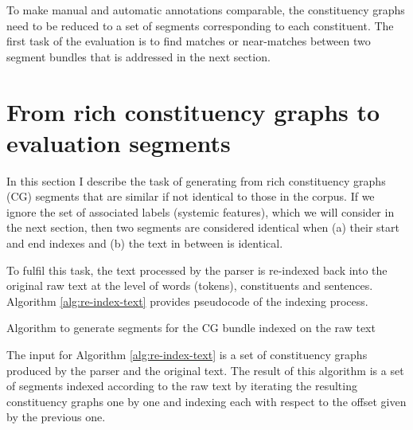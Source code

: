 To make manual and automatic annotations comparable, the constituency graphs need to be reduced to a set of segments corresponding to each constituent. The first task of the evaluation is to find matches or near-matches between two segment bundles that is addressed in the next section.

\section{From rich constituency graphs to evaluation segments}
\label{sec:segment-alignment}
In this section I describe the task of generating from rich constituency graphs (CG) segments that are similar if not identical to those in the corpus. If we ignore the set of associated labels (systemic features), which we will consider in the next section, then two segments are considered identical when (a) their start and end indexes and (b) the text in between is identical.

To fulfil this task, the text processed by the parser is re-indexed back into the original raw text at the level of words (tokens), constituents and sentences. Algorithm \ref{alg:re-index-text} provides pseudocode of the indexing process.

\begin{algorithm}[!ht]
    \caption{Algorithm to generate segments for the CG bundle indexed on the raw text}
    \label{alg:re-index-text}
\end{algorithm}

The input for Algorithm \ref{alg:re-index-text} is a set of constituency graphs produced by the parser and the original text. The result of this algorithm is a set of segments indexed according to the raw text by iterating the resulting constituency graphs one by one and indexing each with respect to the offset given by the previous one. 

